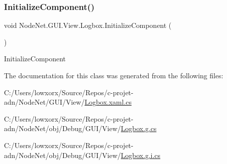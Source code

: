 \mbox{\label{class_node_net_1_1_g_u_i_1_1_view_1_1_logbox_aec0d90766cc946074cde168ef601963c}} 
\subsubsection{\texorpdfstring{Initialize\+Component()}{InitializeComponent()}\hspace{0.1cm}{\footnotesize\ttfamily [2/2]}}
{\footnotesize\ttfamily void Node\+Net.\+G\+U\+I.\+View.\+Logbox.\+Initialize\+Component (\begin{DoxyParamCaption}{ }\end{DoxyParamCaption})}



Initialize\+Component 



The documentation for this class was generated from the following files\+:\begin{DoxyCompactItemize}
\item 
C\+:/\+Users/lowxorx/\+Source/\+Repos/c-\/projet-\/adn/\+Node\+Net/\+G\+U\+I/\+View/\hyperlink{_logbox_8xaml_8cs}{Logbox.\+xaml.\+cs}\item 
C\+:/\+Users/lowxorx/\+Source/\+Repos/c-\/projet-\/adn/\+Node\+Net/obj/\+Debug/\+G\+U\+I/\+View/\hyperlink{_logbox_8g_8cs}{Logbox.\+g.\+cs}\item 
C\+:/\+Users/lowxorx/\+Source/\+Repos/c-\/projet-\/adn/\+Node\+Net/obj/\+Debug/\+G\+U\+I/\+View/\hyperlink{_logbox_8g_8i_8cs}{Logbox.\+g.\+i.\+cs}\end{DoxyCompactItemize}

